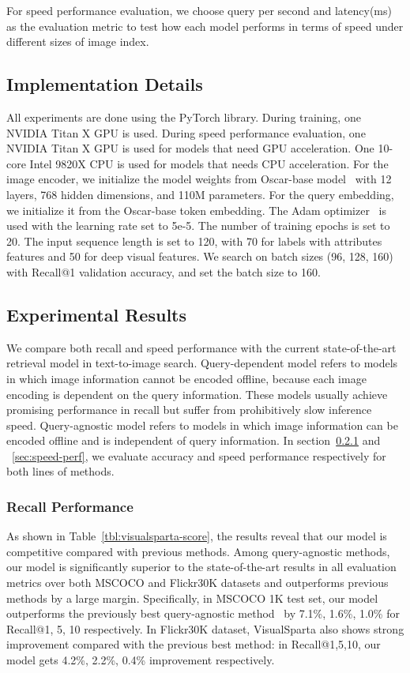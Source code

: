 For speed performance evaluation, we choose query per second and latency(ms) as the evaluation metric to test how each model performs in terms of speed under different sizes of image index.

\subsection{Implementation Details}
All experiments are done using the PyTorch library. During training, one NVIDIA Titan X GPU is used. During speed performance evaluation, one NVIDIA Titan X GPU is used for models that need GPU acceleration. One 10-core Intel 9820X CPU is used for models that needs CPU acceleration. For the image encoder, we initialize the model weights from Oscar-base model~\cite{li2020oscar} with 12 layers, 768 hidden dimensions, and 110M parameters. For the query embedding, we initialize it from the Oscar-base token embedding. The Adam optimizer~\cite{kingma2014adam} is used with the learning rate set to 5e-5. The number of training epochs is set to 20. The input sequence length is set to 120, with 70 for labels with attributes features and 50 for deep visual features. We search on batch sizes (96, 128, 160) with Recall@1 validation accuracy, and set the batch size to 160.


\subsection{Experimental Results}
We compare both recall and speed performance with the current state-of-the-art retrieval model in text-to-image search. Query-dependent model refers to models in which image information cannot be encoded offline, because each image encoding is dependent on the query information. These models usually achieve promising performance in recall but suffer from prohibitively slow inference speed. Query-agnostic model refers to models in which image information can be encoded offline and is independent of query information. In section~\ref{sec:recall-perf} and ~\ref{sec:speed-perf}, we evaluate accuracy and speed performance respectively for both lines of methods.




\subsubsection{Recall Performance}
\label{sec:recall-perf}

As shown in Table~\ref{tbl:visualsparta-score}, the results reveal that our model is competitive compared with previous methods. Among query-agnostic methods, our model is significantly superior to the state-of-the-art results in all evaluation metrics over both MSCOCO and Flickr30K datasets and outperforms previous methods by a large margin. Specifically, in MSCOCO 1K test set, our model outperforms the previously best query-agnostic method~\cite{wang2019position} by 7.1\%, 1.6\%, 1.0\% for Recall@1, 5, 10 respectively. In Flickr30K dataset, VisualSparta also shows strong improvement compared with the previous best method: in Recall@1,5,10, our model gets 4.2\%, 2.2\%, 0.4\% improvement respectively.

